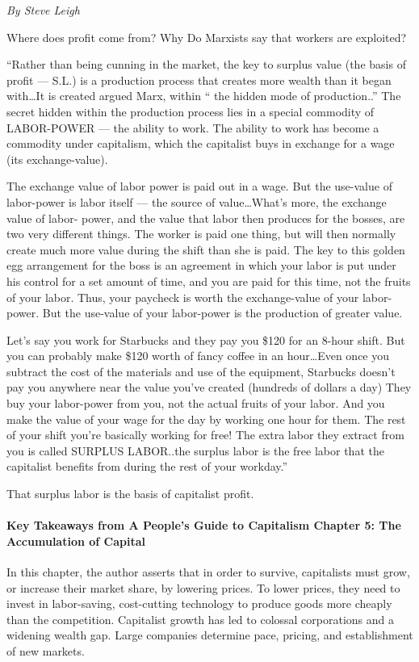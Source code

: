 \emph{By Steve Leigh}

Where does profit come from? Why Do Marxists say that workers are exploited?

“Rather than being cunning in the market, the key to surplus value (the basis of profit — S.L.) is a production process that creates more wealth than it began with…It is created argued Marx, within “ the hidden mode of production..” The secret hidden within the production process lies in a special commodity of LABOR-POWER — the ability to work. The ability to work has become a commodity under capitalism, which the capitalist buys in exchange for a wage (its exchange-value).

The exchange value of labor power is paid out in a wage. But the use-value of labor-power is labor itself — the source of value…What’s more, the exchange value of labor- power, and the value that labor then produces for the bosses, are two very different things. The worker is paid one thing, but will then normally create much more value during the shift than she is paid. The key to this golden egg arrangement for the boss is an agreement in which your labor is put under his control for a set amount of time, and you are paid for this time, not the fruits of your labor. Thus, your paycheck is worth the exchange-value of your labor-power. But the use-value of your labor-power is the production of greater value.

Let’s say you work for Starbucks and they pay you \$120 for an 8-hour shift. But you can probably make \$120 worth of fancy coffee in an hour…Even once you subtract the cost of the materials and use of the equipment, Starbucks doesn’t pay you anywhere near the value you’ve created (hundreds of dollars a day) They buy your labor-power from you, not the actual fruits of your labor. And you make the value of your wage for the day by working one hour for them. The rest of your shift you’re basically working for free! The extra labor they extract from you is called SURPLUS LABOR..the surplus labor is the free labor that the capitalist benefits from during the rest of your workday.”

That surplus labor is the basis of capitalist profit.

\paragraph{Key Takeaways from A People’s Guide to Capitalism Chapter 5: The Accumulation of Capital}

In this chapter, the author asserts that in order to survive, capitalists must grow, or increase their market share, by lowering prices. To lower prices, they need to invest in labor-saving, cost-cutting technology to produce goods more cheaply than the competition. Capitalist growth has led to colossal corporations and a widening wealth gap. Large companies determine pace, pricing, and establishment of new markets.

